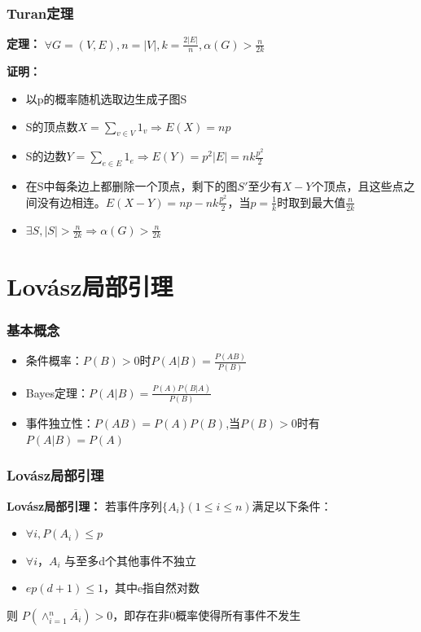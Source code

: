 \documentclass[AutoFakeBold]{beamer}
\begin{document}
{\begin{frame}
    \end{frame}

    \begin{frame}
        \frametitle{Turan定理}
    
        \textbf{定理：} \(\forall G=(V,E),n=|V|,k=\frac{2|E|}{n},\alpha(G)>\frac{n}{2k}\)

        \textbf{证明：}

        \begin{itemize}
            \item 以p的概率随机选取边生成子图S
            \item S的顶点数\(X=\sum_{v\in V} 1_v\Rightarrow E(X)=np\)
            \item S的边数\(Y=\sum_{e\in E} 1_e\Rightarrow E(Y)=p^2|E|=nk\frac{p^2}{2}\)
            \item 在S中每条边上都删除一个顶点，剩下的图\(S'\)至少有\(X-Y\)个顶点，且这些点之间没有边相连。\(E(X-Y)=np-nk\frac{p^2}{2}\)，当\(p=\frac{1}{k}\)时取到最大值\(\frac{n}{2k}\)
            \item \(\exists S, |S|>\frac{n}{2k}\Rightarrow \alpha(G)>\frac{n}{2k}\)
        \end{itemize}
    
    \end{frame}

    \section{Lovász局部引理}

    \begin{frame}
        \frametitle{基本概念}
    
        \begin{itemize}
            \item 条件概率：\(P(B)>0\)时$P(A|B)=\frac{P(AB)}{P(B)}$
            \item Bayes定理：$P(A|B) = \frac{P(A)P(B|A)}{P(B)}$
            \item 事件独立性：$P(AB)=P(A)P(B)$,当\(P(B)>0\)时有\(P(A|B) = P(A)\)
        \end{itemize}
    
    \end{frame}

    \begin{frame}
        \frametitle{Lovász局部引理}
    
        \textbf{Lovász局部引理：} 若事件序列$\{A_i\}(1 \le i \le n)$满足以下条件：
        \begin{itemize}
            \item $\forall i, P(A_i) \le p$
            \item $\forall i$，$A_i$ 与至多d个其他事件不独立
            \item $ep(d+1) \le 1$，其中e指自然对数
        \end{itemize}
        则 $P(\wedge_{i=1}^{n}\overline{A_i}) > 0$，即存在非0概率使得所有事件不发生
    

\end{frame}}
\end{document}
